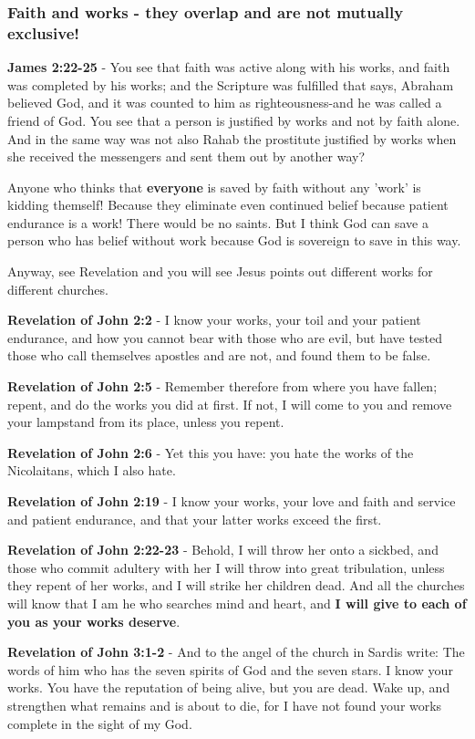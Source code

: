 \documentclass[11pt]{article}
\begin{document}
\subsubsection{Faith and works - they overlap and are \textbf{not} mutually exclusive!}
\label{sec:orgce811aa}
\textbf{James 2:22-25} - You see that faith was active along with his works, and faith was completed by his works; and the Scripture was fulfilled that says, Abraham believed God, and it was counted to him as righteousness-and he was called a friend of God.  You see that a person is justified by works and not by faith alone.  And in the same way was not also Rahab the prostitute justified by works when she received the messengers and sent them out by another way?

Anyone who thinks that \textbf{everyone} is saved by faith without any 'work' is kidding themself!
Because they eliminate even continued belief because patient endurance is a work!
There would be no saints.
But I think God can save a person who has belief without work because God is sovereign to save in this way.

Anyway, see Revelation and you will see Jesus points out different works for different churches.

\textbf{Revelation of John 2:2} - I know your works, your toil and your patient endurance, and how you cannot bear with those who are evil, but have tested those who call themselves apostles and are not, and found them to be false.

\textbf{Revelation of John 2:5} - Remember therefore from where you have fallen; repent, and do the works you did at first. If not, I will come to you and remove your lampstand from its place, unless you repent.

\textbf{Revelation of John 2:6} - Yet this you have: you hate the works of the Nicolaitans, which I also hate.

\textbf{Revelation of John 2:19} - I know your works, your love and faith and service and patient endurance, and that your latter works exceed the first.

\textbf{Revelation of John 2:22-23} - Behold, I will throw her onto a sickbed, and those who commit adultery with her I will throw into great tribulation, unless they repent of her works, and I will strike her children dead. And all the churches will know that I am he who searches mind and heart, and \textbf{I will give to each of you as your works deserve}.

\textbf{Revelation of John 3:1-2} - And to the angel of the church in Sardis write: The words of him who has the seven spirits of God and the seven stars. I know your works. You have the reputation of being alive, but you are dead. Wake up, and strengthen what remains and is about to die, for I have not found your works complete in the sight of my God.
\end{document}
